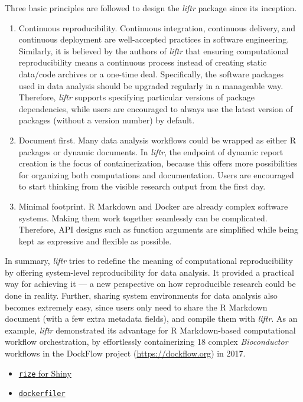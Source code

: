 Three basic principles are followed to design the \emph{liftr} package
since its inception.

\begin{enumerate}
\def\labelenumi{\arabic{enumi}.}
\item
  Continuous reproducibility. Continuous integration, continuous
  delivery, and continuous deployment are well-accepted practices in
  software engineering. Similarly, it is believed by the authors of
  \emph{liftr} that ensuring computational reproducibility means a
  continuous process instead of creating static data/code archives or a
  one-time deal. Specifically, the software packages used in data
  analysis should be upgraded regularly in a manageable way. Therefore,
  \emph{liftr} supports specifying particular versions of package
  dependencies, while users are encouraged to always use the latest
  version of packages (without a version number) by default.
\item
  Document first. Many data analysis workflows could be wrapped as
  either R packages or dynamic documents. In \emph{liftr}, the endpoint
  of dynamic report creation is the focus of containerization, because
  this offers more possibilities for organizing both computations and
  documentation. Users are encouraged to start thinking from the visible
  research output from the first day.
\item
  Minimal footprint. R Markdown and Docker are already complex software
  systems. Making them work together seamlessly can be complicated.
  Therefore, API designs such as function arguments are simplified while
  being kept as expressive and flexible as possible.
\end{enumerate}

In summary, \emph{liftr} tries to redefine the meaning of computational
reproducibility by offering system-level reproducibility for data
analysis. It provided a practical way for achieving it --- a new
perspective on how reproducible research could be done in reality.
Further, sharing system environments for data analysis also becomes
extremely easy, since users only need to share the R Markdown document
(with a few extra metadata fields), and compile them with \emph{liftr}.
As an example, \emph{liftr} demonstrated its advantage for R
Markdown-based computational workflow orchestration, by effortlessly
containerizing 18 complex \emph{Bioconductor} workflows in the DockFlow
project (\url{https://dockflow.org}) in 2017.

\begin{itemize}
\tightlist
\item
  \href{https://github.com/cole-brokamp/rize}{\texttt{rize} for Shiny}
\item
  \href{https://github.com/ColinFay/dockerfiler}{\texttt{dockerfiler}}
\end{itemize}

